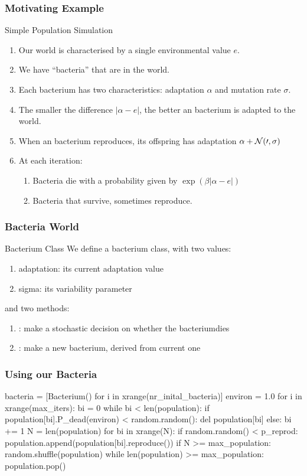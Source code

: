\begin{frame}[fragile] 
\frametitle{Motivating Example}
\begin{block}{Simple Population Simulation}
\begin{enumerate}
\item Our world is characterised by a single environmental value $e$.
\item We have ``bacteria'' that are in the world.
\item Each bacterium has two characteristics: adaptation $\alpha$ and mutation rate $\sigma$.
\item The smaller the difference $|\alpha-e|$, the better an bacterium is adapted to the world.
\item When an bacterium reproduces, its offspring has adaptation $\alpha + \cal{N}(0,\sigma)$
\item At each iteration:
\begin{enumerate}
\item Bacteria die with a probability given by $\exp(\beta|\alpha-e|)$
\item Bacteria that survive, sometimes reproduce.
\end{enumerate}
\end{enumerate}
\end{block}

\end{frame}

\begin{frame}[fragile] 
\frametitle{Bacteria World}
\begin{block}{Bacterium Class}
We define a bacterium class, with two values:
\begin{enumerate}
\item adaptation: its current adaptation value
\item sigma: its variability parameter
\end{enumerate}
and two methods:
\begin{enumerate}
\item {}: make a stochastic decision on whether the bacteriumdies
\item {}: make a new bacterium, derived from current one
\end{enumerate}
\end{block}

\end{frame}

\begin{frame}[fragile] 
\frametitle{Using our Bacteria}
\begin{python}
bacteria = [Bacterium() for i in xrange(nr_inital_bacteria)]
environ = 1.0
for i in xrange(max_iters):
    bi = 0
    while bi < len(population):
        if population[bi].P_dead(environ) < random.random():
            del population[bi]
        else:
            bi += 1
    N = len(population)
    for bi in xrange(N):
        if random.random() < p_reprod:
            population.append(population[bi].reproduce())
    if N >= max_population:
        random.shuffle(population)
        while len(population) >= max_population:
            population.pop()
\end{python}
\end{frame}

